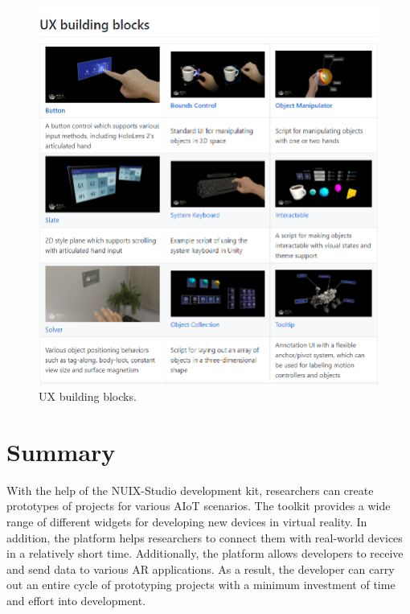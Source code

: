 \begin{figure}
  \centering
  \includegraphics[width=0.6\linewidth]{figures/MRTK.png}
  \caption{UX building blocks.}
  \label{fig:MRTK-figure}
\end{figure}

\section{Summary}

With the help of the NUIX-Studio development kit, researchers can create prototypes of projects for various AIoT scenarios. The toolkit provides a wide range of different widgets for developing new devices in virtual reality. In addition, the platform helps researchers to connect them with real-world devices in a relatively short time. Additionally, the platform allows developers to receive and send data to various AR applications. As a result, the developer can carry out an entire cycle of prototyping projects with a minimum investment of time and effort into development.
